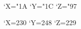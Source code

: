 %
%
%
%



\begingroup
\lccode`X="1A
\lccode`Y="1C
\lccode`Z="97 %

\endgroup

\begingroup
\lccode`X=230
\lccode`Y=248
\lccode`Z=229

\endgroup
